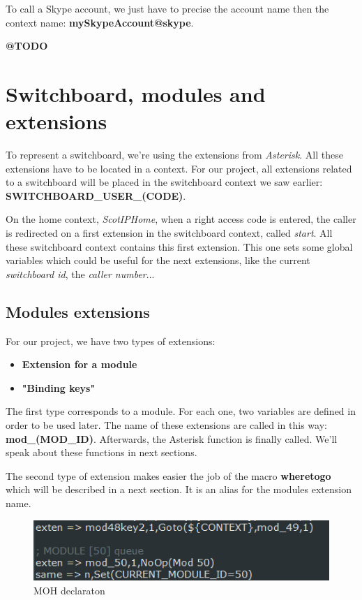 To call a Skype account, we just have to precise the account name then the context name: \textbf{mySkypeAccount@skype}. 


\textbf{@TODO}

\section{Switchboard, modules and extensions}
To represent a switchboard, we're using the extensions from \textit{Asterisk}. All these extensions have to be located in a context. For our project, all extensions related to a switchboard will be placed in the switchboard context we saw earlier: \textbf{SWITCHBOARD\_USER\_(CODE)}. \newline

On the home context, \textit{ScotIPHome}, when a right access code is entered, the caller is redirected on a first extension in the switchboard context, called \textit{start}.
All these switchboard context contains this first extension. This one sets some global variables which could be useful for the next extensions, like the current \textit{switchboard id}, the \textit{caller number}... \newline

\subsection{Modules extensions}

For our project, we have two types of extensions:
\begin{itemize}
\item \textbf{Extension for a module}
\item \textbf{"Binding keys"}
\end{itemize}

The first type corresponds to a module. For each one, two variables are defined in order to be used later. The name of these extensions are called in this way: \textbf{mod\_(MOD\_ID)}.
Afterwards, the Asterisk function is finally called.  We'll speak about these functions in next sections.
\newline

The second type of extension makes easier the job of the macro \textbf{wheretogo} which will be described in a next section. It is an alias for the modules extension name.



\begin{figure}[!ht]
  \caption{MOH declaraton}
  \centering
    \includegraphics[width=1\textwidth]{img/modname.png}
\end{figure}



